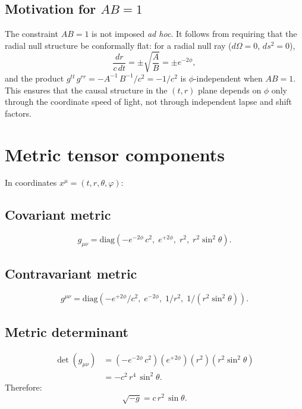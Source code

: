 \documentclass[11pt,letterpaper]{article}
\numberwithin{equation}{section}
\begin{document}
\subsection{Motivation for $AB=1$}

The constraint $AB = 1$ is not imposed \textit{ad hoc}. It follows from requiring that
the radial null structure be conformally flat: for a radial null ray
($d\Omega = 0$, $ds^2 = 0$),
\begin{equation}
  \frac{dr}{c\,dt} = \pm\sqrt{\frac{A}{B}} = \pm e^{-2\phi},
\end{equation}
and the product $g^{tt}\,g^{rr} = -A^{-1}\,B^{-1}/c^2 = -1/c^2$ is
$\phi$-independent when $AB=1$. This ensures that the causal structure
in the $(t,r)$ plane depends on $\phi$ only through the coordinate speed of
light, not through independent lapse and shift factors.

\section{Metric tensor components}
\label{sec:metric_components}

In coordinates $x^\mu = (t, r, \theta, \varphi)$:

\subsection{Covariant metric}
\begin{equation}
\label{eq:g_down}
  g_{\mu\nu} = \mathrm{diag}\!\left(-e^{-2\phi}\,c^2,\; e^{+2\phi},\; r^2,\; r^2\sin^2\theta\right).
\end{equation}

\subsection{Contravariant metric}
\begin{equation}
\label{eq:g_up}
  g^{\mu\nu} = \mathrm{diag}\!\left(-e^{+2\phi}/c^2,\; e^{-2\phi},\; 1/r^2,\; 1/(r^2\sin^2\theta)\right).
\end{equation}

\subsection{Metric determinant}
\begin{align}
  \det(g_{\mu\nu}) &= \left(-e^{-2\phi}\,c^2\right)\left(e^{+2\phi}\right)\left(r^2\right)\left(r^2\sin^2\theta\right) \nonumber\\
  &= -c^2\,r^4\,\sin^2\theta.
\label{eq:det_g}
\end{align}
Therefore:
\begin{equation}
\label{eq:sqrtg}
\boxed{
  \sqrt{-g} = c\,r^2\,\sin\theta.
}
\end{equation}
\end{document}
